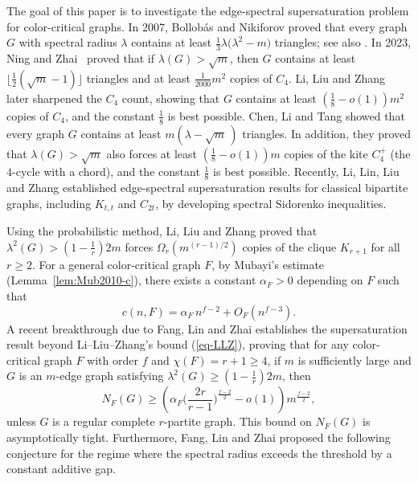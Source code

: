 \documentclass[11pt,a4paper]{article}
\theoremstyle{definition}
\theoremstyle{plain}
\renewcommand{\ge}{\geqslant}
\begin{document}
\smallskip  
The goal of this paper is to investigate the edge-spectral supersaturation problem for color-critical graphs. 
 In 2007, Bollob\'{a}s and Nikiforov \cite{BN2007jctb} proved that
every graph $G$ with spectral radius $\lambda$ contains at least
        $\frac13\lambda \bigl(\lambda^2-m\bigr)$
triangles; see also \cite[Lemma 7]{CFTZ20}. In 2023, 
Ning and Zhai~\cite{NZ2021,NZ2021b} proved that if 
$\lambda(G)>\sqrt m$, then $G$ contains at least $\lfloor \frac{1}{2} (\sqrt m-1)\rfloor$ triangles 
and at least
$\frac1{2000}m^2$ copies of $C_4$.  
Li, Liu and Zhang~\cite{LiLiuZhang26} later sharpened the $C_4$ count, showing that $G$ 
contains at least $\left(\frac{1}{8} - o(1) \right)m^2$ copies of $C_4$, and the constant $\frac{1}{8}$ is best possible. 
Chen, Li and Tang \cite{CLT2026} showed that every graph $G$ contains at least $m(\lambda -\sqrt{m}\,)$ triangles. In addition, 
they \cite{CLT2026} proved that $\lambda (G)> \sqrt{m}$ also forces at least $\left(\frac{1}{8} - o(1) \right)m$ copies of the kite $C_4^+$ (the $4$-cycle with a chord), and the constant $\frac{1}{8}$ is best possible. 
Recently, Li, Lin, Liu and Zhang \cite{LLLZ2026} established edge-spectral supersaturation results for classical bipartite graphs, including $K_{t,t}$ and $C_{2t}$, 
by developing spectral Sidorenko inequalities. 


\smallskip 
Using the probabilistic method, Li, Liu and Zhang \cite{LiLiuZhang26} proved that $\lambda^2(G) > (1- \frac{1}{r})2m$ forces $\Omega_r(m^{(r-1)/2})$ copies of the clique $K_{r+1}$ for all $r\ge 2$. For a general color-critical graph $F$, 
by Mubayi's estimate  (Lemma~\ref{lem:Mub2010-c}), there exists a constant $\alpha_F>0$ depending on $F$ such that 
\begin{equation*} \label{eq-alpha}
  c(n,F)=\alpha_F \, n^{f-2}+O_F(n^{f-3}).
\end{equation*}  
A recent breakthrough due to   
Fang, Lin and Zhai \cite{FLZ} establishes the supersaturation result  beyond Li--Liu--Zhang's bound (\ref{eq-LLZ}), proving  that for any color-critical graph $F$ with order $f$ and $\chi (F)=r+1\ge 4$, if $m$ is sufficiently large and $G$ is an $m$-edge graph satisfying $\lambda^2(G) \ge (1- \frac{1}{r})2m$, then
 \begin{equation*} \label{eq-FLZ}
  N_F(G) \ge \left( \alpha_F \Big(\frac{2r}{r-1} \Big)^{\!\! \frac{f-2}{2}} - o(1) \right)m^{\frac{f-2}{2}}, 
  \end{equation*} 
unless $G$ is a regular complete $r$-partite graph. 
This bound on $N_F(G)$ is asymptotically tight. 
Furthermore, 
Fang, Lin and Zhai \cite{FLZ} proposed the following conjecture for the regime where the spectral radius exceeds the threshold by a constant additive gap. 
\end{document}
